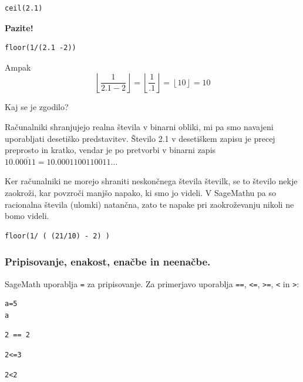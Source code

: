 \begin{verbatim}
ceil(2.1)
\end{verbatim}

\textbf{Pazite!}

\begin{verbatim}
floor(1/(2.1 -2))
\end{verbatim}

Ampak
\begin{equation}
\left\lfloor \frac{1}{2.1 - 2} \right\rfloor = \left\lfloor \frac{1}{.1} \right\rfloor = \left\lfloor 10 \right\rfloor = 10
\end{equation}

Kaj se je zgodilo?

Računalniki shranjujejo realna števila v binarni obliki, mi pa smo navajeni uporabljati desetiško predstavitev. Število 2.1 v desetiškem zapisu je precej preprosto in kratko, vendar je po pretvorbi v binarni zapis $10.0\overline{0011} = 10.0001100110011 \dots$

Ker računalniki ne morejo shraniti neskončnega števila številk, se to število nekje zaokroži, kar povzroči manjšo napako, ki smo jo videli.
V SageMathu pa so racionalna števila (ulomki) natančna, zato te napake pri zaokroževanju nikoli ne bomo videli.

\begin{verbatim}
floor(1/ ( (21/10) - 2) )
\end{verbatim}

\subsubsection{Pripisovanje, enakost, enačbe in neenačbe.}

SageMath uporablja \texttt{=} za pripisovanje. Za primerjavo uporablja \texttt{==}, \texttt{\textless =}, \texttt{\textgreater =}, \texttt{\textless } in \texttt{\textgreater }:

\begin{verbatim}
a=5
a
\end{verbatim}

\begin{verbatim}
2 == 2
\end{verbatim}

\begin{verbatim}
2<=3
\end{verbatim}

\begin{verbatim}
2<2
\end{verbatim}

